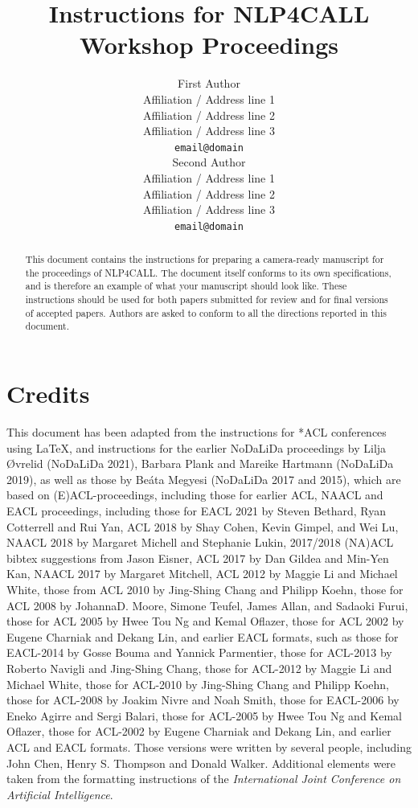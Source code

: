 \documentclass[11pt]{article}
\title{Instructions for NLP4CALL Workshop Proceedings}
\author{First Author \\
  Affiliation / Address line 1 \\
  Affiliation / Address line 2 \\
  Affiliation / Address line 3 \\
  {\tt email@domain} \\\And
  Second Author \\
  Affiliation / Address line 1 \\
  Affiliation / Address line 2 \\
  Affiliation / Address line 3 \\
  {\tt email@domain} \\
  }
\date{}
\begin{document}
\maketitle
\begin{abstract}
  This document contains the instructions for preparing a camera-ready
  manuscript for the proceedings of NLP4CALL. The document itself
  conforms to its own specifications, and is therefore an example of
  what your manuscript should look like. These instructions should be
  used for both papers submitted for review and for final versions of
  accepted papers.  Authors are asked to conform to all the directions
  reported in this document.
\end{abstract}

\section{Credits}

This document has been adapted from the instructions for *ACL conferences using \LaTeX, and instructions for the earlier
NoDaLiDa proceedings by Lilja Øvrelid (NoDaLiDa 2021), Barbara Plank and Mareike Hartmann (NoDaLiDa 2019), as well as those by Be\'{a}ta Megyesi (NoDaLiDa 2017 and 2015), which are
based on (E)ACL-proceedings, including those for earlier ACL, NAACL and EACL proceedings,
including 
those for EACL 2021 by Steven Bethard, Ryan Cotterrell and Rui Yan, ACL 2018 by Shay Cohen, Kevin Gimpel, and Wei Lu, 
NAACL 2018 by Margaret Michell and Stephanie Lukin,
2017/2018 (NA)ACL bibtex suggestions from Jason Eisner,
ACL 2017 by Dan Gildea and Min-Yen Kan, 
NAACL 2017 by Margaret Mitchell, 
ACL 2012 by Maggie Li and Michael White, 
those from ACL 2010 by Jing-Shing Chang and Philipp Koehn, 
those for ACL 2008 by JohannaD. Moore, Simone Teufel, James Allan, and Sadaoki Furui, 
those for ACL 2005 by Hwee Tou Ng and Kemal Oflazer, 
those for ACL 2002 by Eugene Charniak and Dekang Lin, 
and earlier EACL formats, such as those for
EACL-2014 by Gosse Bouma
and Yannick Parmentier, those for ACL-2013 by Roberto Navigli
and Jing-Shing Chang, those for ACL-2012 by Maggie Li and Michael
White, those for ACL-2010 by Jing-Shing Chang and Philipp Koehn,
those for ACL-2008 by Joakim Nivre and Noah Smith, 
those for EACL-2006 by Eneko Agirre and Sergi Balari, 
those for ACL-2005 by Hwee Tou Ng and Kemal Oflazer, those for
ACL-2002 by Eugene Charniak and Dekang Lin, and earlier ACL and EACL
formats. Those versions were written by several people, including John
Chen, Henry S. Thompson and Donald Walker. Additional elements were
taken from the formatting instructions of the {\em International Joint
  Conference on Artificial Intelligence}.
\end{document}
